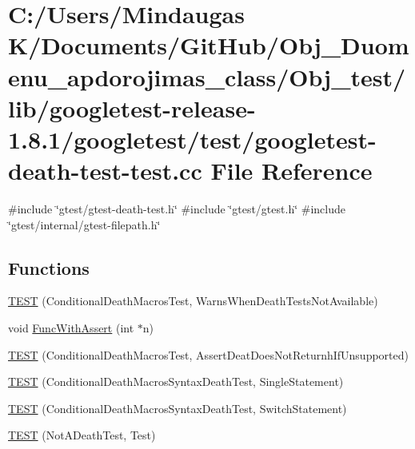 \hypertarget{_obj__test_2lib_2googletest-release-1_88_81_2googletest_2test_2googletest-death-test-test_8cc}{}\section{C\+:/\+Users/\+Mindaugas K/\+Documents/\+Git\+Hub/\+Obj\+\_\+\+Duomenu\+\_\+apdorojimas\+\_\+class/\+Obj\+\_\+test/lib/googletest-\/release-\/1.8.1/googletest/test/googletest-\/death-\/test-\/test.cc File Reference}
\label{_obj__test_2lib_2googletest-release-1_88_81_2googletest_2test_2googletest-death-test-test_8cc}
{\ttfamily \#include \char`\"{}gtest/gtest-\/death-\/test.\+h\char`\"{}}\newline
{\ttfamily \#include \char`\"{}gtest/gtest.\+h\char`\"{}}\newline
{\ttfamily \#include \char`\"{}gtest/internal/gtest-\/filepath.\+h\char`\"{}}\newline
\subsection*{Functions}
\begin{DoxyCompactItemize}
\item 
\mbox{\hyperlink{_obj__test_2lib_2googletest-release-1_88_81_2googletest_2test_2googletest-death-test-test_8cc_a8a47cdbd11c2456db464fe098d134aa0}{T\+E\+ST}} (Conditional\+Death\+Macros\+Test, Warns\+When\+Death\+Tests\+Not\+Available)
\item 
void \mbox{\hyperlink{_obj__test_2lib_2googletest-release-1_88_81_2googletest_2test_2googletest-death-test-test_8cc_afe40addf0e0bb4657d18f512092ef03b}{Func\+With\+Assert}} (int $\ast$n)
\item 
\mbox{\hyperlink{_obj__test_2lib_2googletest-release-1_88_81_2googletest_2test_2googletest-death-test-test_8cc_acdbff3626995270fcbcc0b97e303d742}{T\+E\+ST}} (Conditional\+Death\+Macros\+Test, Assert\+Deat\+Does\+Not\+Returnh\+If\+Unsupported)
\item 
\mbox{\hyperlink{_obj__test_2lib_2googletest-release-1_88_81_2googletest_2test_2googletest-death-test-test_8cc_aacb04a80e0263de84b203b95cc421437}{T\+E\+ST}} (Conditional\+Death\+Macros\+Syntax\+Death\+Test, Single\+Statement)
\item 
\mbox{\hyperlink{_obj__test_2lib_2googletest-release-1_88_81_2googletest_2test_2googletest-death-test-test_8cc_a8d27f7b1efa4db83935274467e17f40c}{T\+E\+ST}} (Conditional\+Death\+Macros\+Syntax\+Death\+Test, Switch\+Statement)
\item 
\mbox{\hyperlink{_obj__test_2lib_2googletest-release-1_88_81_2googletest_2test_2googletest-death-test-test_8cc_af77aa369d8ed7d7ceefda4e7b073b05a}{T\+E\+ST}} (Not\+A\+Death\+Test, Test)
\end{DoxyCompactItemize}


